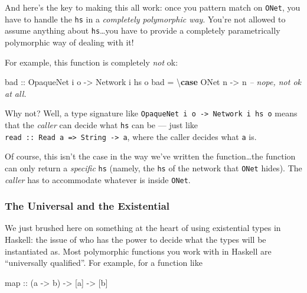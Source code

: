 \documentclass[]{article}
\newenvironment{Shaded}{}{}
\newcommand{\KeywordTok}[1]{\textcolor[rgb]{0.00,0.44,0.13}{\textbf{{#1}}}}
\newcommand{\DataTypeTok}[1]{\textcolor[rgb]{0.56,0.13,0.00}{{#1}}}
\newcommand{\CommentTok}[1]{\textcolor[rgb]{0.38,0.63,0.69}{\textit{{#1}}}}
\newcommand{\OtherTok}[1]{\textcolor[rgb]{0.00,0.44,0.13}{{#1}}}
\newcommand{\FunctionTok}[1]{\textcolor[rgb]{0.02,0.16,0.49}{{#1}}}
\newcommand{\NormalTok}[1]{{#1}}
\begin{document}
And here's the key to making this all work: once you pattern match on
\texttt{ONet}, you have to handle the \texttt{hs} in a \emph{completely
polymorphic way}. You're not allowed to assume anything about
\texttt{hs}\ldots{}you have to provide a completely parametrically polymorphic
way of dealing with it!

For example, this function is completely \emph{not} ok:

\begin{Shaded}
\begin{Highlighting}[]
\OtherTok{bad ::} \DataTypeTok{OpaqueNet} \NormalTok{i o }\OtherTok{->} \DataTypeTok{Network} \NormalTok{i hs o}
\NormalTok{bad }\FunctionTok{=} \NormalTok{\textbackslash{}}\KeywordTok{case} \DataTypeTok{ONet} \NormalTok{n }\OtherTok{->} \NormalTok{n          }\CommentTok{-- nope, not ok at all.}
\end{Highlighting}
\end{Shaded}

Why not? Well, a type signature like
\texttt{OpaqueNet\ i\ o\ -\textgreater{}\ Network\ i\ hs\ o} means that the
\emph{caller} can decide what \texttt{hs} can be --- just like
\texttt{read\ ::\ Read\ a\ =\textgreater{}\ String\ -\textgreater{}\ a}, where
the caller decides what \texttt{a} is.

Of course, this isn't the case in the way we've written the function\ldots{}the
function can only return a \emph{specific} \texttt{hs} (namely, the \texttt{hs}
of the network that \texttt{ONet} hides). The \emph{caller} has to accommodate
whatever is inside \texttt{ONet}.

\subsubsection{The Universal and the
Existential}\label{the-universal-and-the-existential}

We just brushed here on something at the heart of using existential types in
Haskell: the issue of who has the power to decide what the types will be
instantiated as. Most polymorphic functions you work with in Haskell are
``universally qualified''. For example, for a function like

\begin{Shaded}
\begin{Highlighting}[]
\NormalTok{map}\OtherTok{ ::} \NormalTok{(a }\OtherTok{->} \NormalTok{b) }\OtherTok{->} \NormalTok{[a] }\OtherTok{->} \NormalTok{[b]}
\end{Highlighting}
\end{Shaded}
\end{document}
